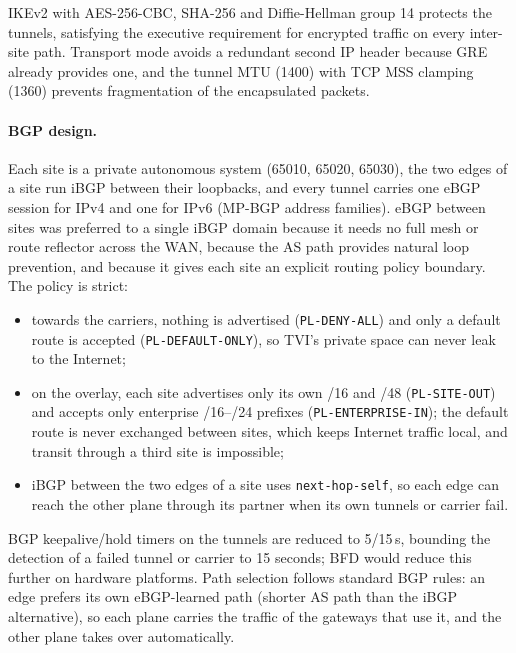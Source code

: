 \documentclass[11pt,a4paper]{article}
\begin{document}



IKEv2 with AES-256-CBC, SHA-256 and Diffie-Hellman group 14 protects the tunnels, satisfying the executive requirement for encrypted traffic on every inter-site path. Transport mode avoids a redundant second IP header because GRE already provides one, and the tunnel MTU (1400) with TCP MSS clamping (1360) prevents fragmentation of the encapsulated packets.

\paragraph{BGP design.} Each site is a private autonomous system (65010, 65020, 65030), the two edges of a site run iBGP between their loopbacks, and every tunnel carries one eBGP session for IPv4 and one for IPv6 (MP-BGP address families). eBGP between sites was preferred to a single iBGP domain because it needs no full mesh or route reflector across the WAN, because the AS path provides natural loop prevention, and because it gives each site an explicit routing policy boundary. The policy is strict:
\begin{itemize}
\item towards the carriers, nothing is advertised (\texttt{PL-DENY-ALL}) and only a default route is accepted (\texttt{PL-DEFAULT-ONLY}), so TVI's private space can never leak to the Internet;
\item on the overlay, each site advertises only its own /16 and /48 (\texttt{PL-SITE-OUT}) and accepts only enterprise /16--/24 prefixes (\texttt{PL-ENTERPRISE-IN}); the default route is never exchanged between sites, which keeps Internet traffic local, and transit through a third site is impossible;
\item iBGP between the two edges of a site uses \texttt{next-hop-self}, so each edge can reach the other plane through its partner when its own tunnels or carrier fail.
\end{itemize}



BGP keepalive/hold timers on the tunnels are reduced to 5/15\,s, bounding the detection of a failed tunnel or carrier to 15 seconds; BFD would reduce this further on hardware platforms. Path selection follows standard BGP rules: an edge prefers its own eBGP-learned path (shorter AS path than the iBGP alternative), so each plane carries the traffic of the gateways that use it, and the other plane takes over automatically.
\end{document}
